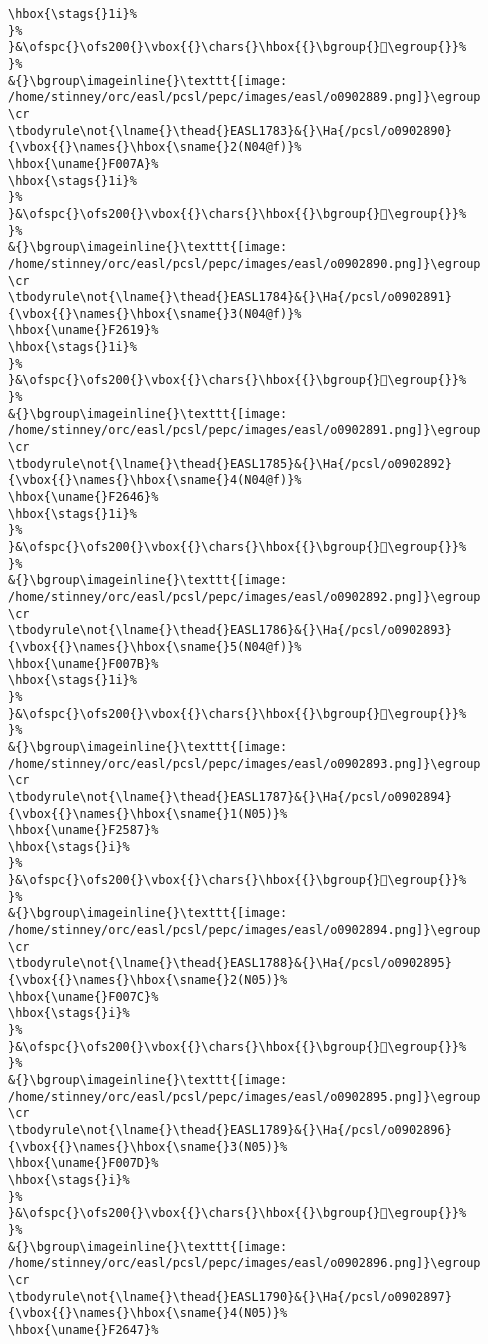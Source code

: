 \begin{verbatim}
\hbox{\stags{}1i}%
}%
}&\ofspc{}\ofs200{}\vbox{{}\chars{}\hbox{{}\bgroup{}󲖆\egroup{}}%
}%
&{}\bgroup\imageinline{}\texttt{[image: /home/stinney/orc/easl/pcsl/pepc/images/easl/o0902889.png]}\egroup
\cr
\tbodyrule\not{\lname{}\thead{}EASL1783}&{}\Ha{/pcsl/o0902890}{\vbox{{}\names{}\hbox{\sname{}2(N04@f)}%
\hbox{\uname{}F007A}%
\hbox{\stags{}1i}%
}%
}&\ofspc{}\ofs200{}\vbox{{}\chars{}\hbox{{}\bgroup{}󰁺\egroup{}}%
}%
&{}\bgroup\imageinline{}\texttt{[image: /home/stinney/orc/easl/pcsl/pepc/images/easl/o0902890.png]}\egroup
\cr
\tbodyrule\not{\lname{}\thead{}EASL1784}&{}\Ha{/pcsl/o0902891}{\vbox{{}\names{}\hbox{\sname{}3(N04@f)}%
\hbox{\uname{}F2619}%
\hbox{\stags{}1i}%
}%
}&\ofspc{}\ofs200{}\vbox{{}\chars{}\hbox{{}\bgroup{}󲘙\egroup{}}%
}%
&{}\bgroup\imageinline{}\texttt{[image: /home/stinney/orc/easl/pcsl/pepc/images/easl/o0902891.png]}\egroup
\cr
\tbodyrule\not{\lname{}\thead{}EASL1785}&{}\Ha{/pcsl/o0902892}{\vbox{{}\names{}\hbox{\sname{}4(N04@f)}%
\hbox{\uname{}F2646}%
\hbox{\stags{}1i}%
}%
}&\ofspc{}\ofs200{}\vbox{{}\chars{}\hbox{{}\bgroup{}󲙆\egroup{}}%
}%
&{}\bgroup\imageinline{}\texttt{[image: /home/stinney/orc/easl/pcsl/pepc/images/easl/o0902892.png]}\egroup
\cr
\tbodyrule\not{\lname{}\thead{}EASL1786}&{}\Ha{/pcsl/o0902893}{\vbox{{}\names{}\hbox{\sname{}5(N04@f)}%
\hbox{\uname{}F007B}%
\hbox{\stags{}1i}%
}%
}&\ofspc{}\ofs200{}\vbox{{}\chars{}\hbox{{}\bgroup{}󰁻\egroup{}}%
}%
&{}\bgroup\imageinline{}\texttt{[image: /home/stinney/orc/easl/pcsl/pepc/images/easl/o0902893.png]}\egroup
\cr
\tbodyrule\not{\lname{}\thead{}EASL1787}&{}\Ha{/pcsl/o0902894}{\vbox{{}\names{}\hbox{\sname{}1(N05)}%
\hbox{\uname{}F2587}%
\hbox{\stags{}i}%
}%
}&\ofspc{}\ofs200{}\vbox{{}\chars{}\hbox{{}\bgroup{}󲖇\egroup{}}%
}%
&{}\bgroup\imageinline{}\texttt{[image: /home/stinney/orc/easl/pcsl/pepc/images/easl/o0902894.png]}\egroup
\cr
\tbodyrule\not{\lname{}\thead{}EASL1788}&{}\Ha{/pcsl/o0902895}{\vbox{{}\names{}\hbox{\sname{}2(N05)}%
\hbox{\uname{}F007C}%
\hbox{\stags{}i}%
}%
}&\ofspc{}\ofs200{}\vbox{{}\chars{}\hbox{{}\bgroup{}󰁼\egroup{}}%
}%
&{}\bgroup\imageinline{}\texttt{[image: /home/stinney/orc/easl/pcsl/pepc/images/easl/o0902895.png]}\egroup
\cr
\tbodyrule\not{\lname{}\thead{}EASL1789}&{}\Ha{/pcsl/o0902896}{\vbox{{}\names{}\hbox{\sname{}3(N05)}%
\hbox{\uname{}F007D}%
\hbox{\stags{}i}%
}%
}&\ofspc{}\ofs200{}\vbox{{}\chars{}\hbox{{}\bgroup{}󰁽\egroup{}}%
}%
&{}\bgroup\imageinline{}\texttt{[image: /home/stinney/orc/easl/pcsl/pepc/images/easl/o0902896.png]}\egroup
\cr
\tbodyrule\not{\lname{}\thead{}EASL1790}&{}\Ha{/pcsl/o0902897}{\vbox{{}\names{}\hbox{\sname{}4(N05)}%
\hbox{\uname{}F2647}%

\end{verbatim}
